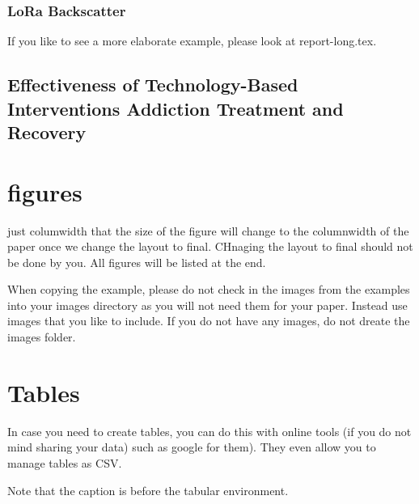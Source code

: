 \documentclass[sigconf]{acmart}
\begin{document}
\subsubsection{LoRa Backscatter}

If you like to see a more elaborate example, please look at
report-long.tex. 


\subsection{Effectiveness of Technology-Based Interventions Addiction Treatment and Recovery}


\section{figures}

just columwidth that the size of the figure will change to the
columnwidth of the paper once we change the layout to final. CHnaging
the layout to final should not be done by you. All figures will be
listed at the end.


When copying the example, please do not check in the images from the
examples into your images directory as you will not need them for your
paper. Instead use images that you like to include. If you do not have
any images, do not dreate the images folder.

\section{Tables}

In case you need to create tables, you can do this with online tools
(if you do not mind sharing your data) such as
google for them). They even allow you to manage tables as CSV.

Note that the caption is before the tabular environment.
\end{document}
